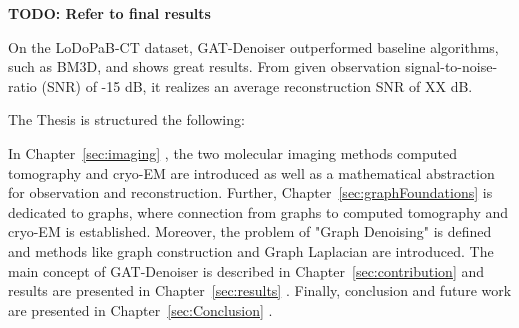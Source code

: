 \textbf{TODO: Refer to final results}

On the LoDoPaB-CT dataset, GAT-Denoiser outperformed baseline algorithms, such as BM3D, and shows great results.
From given observation signal-to-noise-ratio (SNR) of -15 dB, it realizes an average reconstruction SNR of XX dB.

\bigskip

The Thesis is structured the following: 


In Chapter~\ref{sec:imaging} \textit{}, the two molecular imaging methods
computed tomography and cryo-EM are introduced as well as a mathematical abstraction for observation and reconstruction.
Further, Chapter~\ref{sec:graphFoundations} \textit{} is dedicated to graphs, 
where connection from graphs to computed tomography and cryo-EM is established. 
Moreover, the problem of "Graph Denoising" is defined and methods like graph construction and Graph Laplacian are introduced.
The main concept of GAT-Denoiser is described in Chapter~\ref{sec:contribution} \textit{}
and results are presented in Chapter~\ref{sec:results} \textit{}.
Finally, conclusion and future work are presented in Chapter~\ref{sec:Conclusion} \textit{}.

